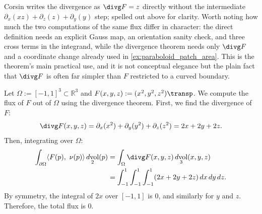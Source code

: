 \begin{ainote}
Corsin writes the divergence as $\divg F = z$ directly without the intermediate
$\partial_x(xz)+\partial_z(z)+\partial_y(y)$ step; spelled out above for clarity. Worth
noting how much the two computations of the same flux differ in character: the direct
definition needs an explicit Gauss map, an orientation sanity check, and three cross terms
in the integrand, while the divergence theorem needs only $\divg F$ and a coordinate change
already used in \cref{ex:paraboloid_patch_area}. This is the theorem's main
practical use, and it is not conceptual elegance but the plain fact that $\divg F$ is often far
simpler than $F$ restricted to a curved boundary.
\end{ainote}

\begin{example}
\label{ex:flux_divergence_cube}
Let $\Omega := [-1,1]^3 \subset \mathbb{R}^3$ and $F(x,y,z) := (x^2, y^2, z^2)\transp$.
We compute the flux of $F$ out of $\Omega$ using the divergence theorem.
First, we find the divergence of $F$:
\[\divg F(x,y,z) = \partial_x(x^2) + \partial_y(y^2) + \partial_z(z^2) = 2x + 2y + 2z.\]
Then, integrating over $\Omega$:
\begin{align*}
\int_{\partial\Omega} \langle F(p),\ \nu(p)\rangle \mathop{d\text{vol}}_2(p) &= \int_\Omega \divg F(x,y,z) \mathop{d\text{vol}}_3(x,y,z) \\
&= \int_{-1}^1 \int_{-1}^1 \int_{-1}^1 (2x + 2y + 2z) \,dx\,dy\,dz.
\end{align*}
By symmetry, the integral of $2x$ over $[-1,1]$ is $0$, and similarly for $y$ and $z$. Therefore, the total flux is $0$.
\end{example}


